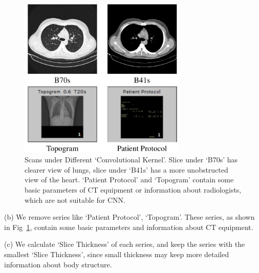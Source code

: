 \documentclass[journal]{IEEEtran}
\begin{document}
\begin{figure}[t]    
    \centerline{\includegraphics[width=80mm]{Bs.pdf}}
    \vspace{-0cm}
    \caption{Scans under Different `Convolutional Kernel'. Slice under `B70s' has clearer view of lungs, slice under `B41s' has a more unobstructed view of the heart. `Patient Protocol' and `Topogram' contain some basic parameters of CT equipment or information about radiologists, which are not suitable for CNN.}
    \vspace{-0cm}
    \label{Bs}

    \end{figure}

(b) We remove series like `Patient Protocol', `Topogram'. These series, as shown in Fig~\ref{Bs}, contain some basic parameters and information about CT equipment.

(c) We calculate `Slice Thickness' of each series, and keep the series with the smallest `Slice Thickness', since small thickness may keep more detailed information about body structure. 
\end{document}
